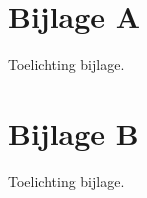 \begin{appendices}
\section*{Bijlage A}

Toelichting bijlage.



\newpage
\section*{Bijlage B}

Toelichting bijlage.

\end{appendices}
